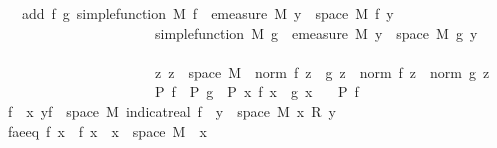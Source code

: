 \begin{isabellebody}
\ \ \ add{\isacharcolon}{\kern0pt}\ {\isachardoublequoteopen}{\isasymAnd}f\ g{\isachardot}{\kern0pt}\ simple{\isacharunderscore}{\kern0pt}function\ M\ f\ {\isasymLongrightarrow}\ emeasure\ M\ {\isacharbraceleft}{\kern0pt}y\ {\isasymin}\ space\ M{\isachardot}{\kern0pt}\ f\ y\ {\isasymnoteq}\ {}{\isacharbraceright}{\kern0pt}\ {\isasymnoteq}\ {\isasyminfinity}\ {\isasymLongrightarrow}\ \isanewline
\ \ \ \ \ \ \ \ \ \ \ \ \ \ \ \ \ \ \ \ \ \ simple{\isacharunderscore}{\kern0pt}function\ M\ g\ {\isasymLongrightarrow}\ emeasure\ M\ {\isacharbraceleft}{\kern0pt}y\ {\isasymin}\ space\ M{\isachardot}{\kern0pt}\ g\ y\ {\isasymnoteq}\ {}{\isacharbraceright}{\kern0pt}\ {\isasymnoteq}\ {\isasyminfinity}\ {\isasymLongrightarrow}\ \isanewline
\ \ \ \ \ \ \ \ \ \ \ \ \ \ \ \ \ \ \ \ \ \ {\isacharparenleft}{\kern0pt}{\isasymAnd}z{\isachardot}{\kern0pt}\ z\ {\isasymin}\ space\ M\ {\isasymLongrightarrow}\ norm\ {\isacharparenleft}{\kern0pt}f\ z\ {\isacharplus}{\kern0pt}\ g\ z{\isacharparenright}{\kern0pt}\ {\isacharequal}{\kern0pt}\ norm\ {\isacharparenleft}{\kern0pt}f\ z{\isacharparenright}{\kern0pt}\ {\isacharplus}{\kern0pt}\ norm\ {\isacharparenleft}{\kern0pt}g\ z{\isacharparenright}{\kern0pt}{\isacharparenright}{\kern0pt}\ {\isasymLongrightarrow}\isanewline
\ \ \ \ \ \ \ \ \ \ \ \ \ \ \ \ \ \ \ \ \ \ P\ f\ {\isasymLongrightarrow}\ P\ g\ {\isasymLongrightarrow}\ P\ {\isacharparenleft}{\kern0pt}{\isasymlambda}x{\isachardot}{\kern0pt}\ f\ x\ {\isacharplus}{\kern0pt}\ g\ x{\isacharparenright}{\kern0pt}{\isachardoublequoteclose}\isanewline
\ \ \ {\isachardoublequoteopen}P\ f{\isachardoublequoteclose}%
\endisatagimportant
{\isafoldimportant}%
%
\isadelimimportant
%
\endisadelimimportant
\isanewline
%
\isadelimproof
%
\endisadelimproof
%
\isatagproof
{}\isamarkupfalse%
{\isacharminus}{\kern0pt}\isanewline
\ \ \isamarkupfalse%
\ {\isacharquery}{\kern0pt}f\ {\isacharequal}{\kern0pt}\ {\isachardoublequoteopen}{\isasymlambda}x{\isachardot}{\kern0pt}\ {\isacharparenleft}{\kern0pt}{\isasymSum}y{\isasymin}f\ {\isacharbackquote}{\kern0pt}\ space\ M{\isachardot}{\kern0pt}\ indicat{\isacharunderscore}{\kern0pt}real\ {\isacharparenleft}{\kern0pt}f\ {\isacharminus}{\kern0pt}{\isacharbackquote}{\kern0pt}\ {\isacharbraceleft}{\kern0pt}y{\isacharbraceright}{\kern0pt}\ {\isasyminter}\ space\ M{\isacharparenright}{\kern0pt}\ x\ {\isacharasterisk}{\kern0pt}\isactrlsub R\ y{\isacharparenright}{\kern0pt}{\isachardoublequoteclose}\isanewline
\ \ \isamarkupfalse%
\ f{\isacharunderscore}{\kern0pt}ae{\isacharunderscore}{\kern0pt}eq{\isacharcolon}{\kern0pt}\ {\isachardoublequoteopen}f\ x\ {\isacharequal}{\kern0pt}\ {\isacharquery}{\kern0pt}f\ x{\isachardoublequoteclose}\ \ {\isachardoublequoteopen}x\ {\isasymin}\ space\ M{\isachardoublequoteclose}\ \ x\ \isamarkupfalse%

\end{isabellebody}
